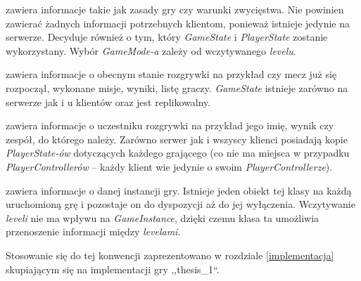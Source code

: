 \documentclass[multip]{SGGW-thesis}
\begin{document}
\begin{description}[itemsep=1\itemsep,parsep=1\parsep,partopsep=1\partopsep,topsep=1\topsep]
\item[GameMode:] zawiera informacje takie jak zasady gry czy warunki zwycięstwa. Nie powinien zawierać żadnych informacji potrzebnych klientom, ponieważ istnieje jedynie na serwerze. Decyduje również o tym, który {\em GameState} i {\em PlayerState} zostanie wykorzystany. Wybór {\em GameMode-a} zależy od wczytywanego {\em levelu}.
\item[GameState:] zawiera informacje o obecnym stanie rozgrywki na przykład czy mecz już się rozpoczął, wykonane misje, wyniki, listę graczy. {\em GameState} istnieje zarówno na serwerze jak i u klientów oraz jest replikowalny.
\item[PlayerState:] zawiera informacje o uczestniku rozgrywki na przykład jego imię, wynik czy zespół, do którego należy. Zarówno serwer jak i wszyscy klienci posiadają kopie {\em PlayerState-ów} dotyczących każdego grającego (co nie ma miejsca w przypadku {\em PlayerControllerów} -- każdy klient wie jedynie o swoim {\em PlayerControllerze}).
\item[GameInstance:] zawiera informacje o danej instancji gry. Istnieje jeden obiekt tej klasy na każdą uruchomioną grę i pozostaje on do dyspozycji aż do jej wyłączenia. Wczytywanie {\em leveli} nie ma wpływu na {\em GameInstance}, dzięki czemu klasa ta umożliwia przenoszenie informacji między {\em levelami}.
\end{description}
Stosowanie się do tej konwencji zaprezentowano w rozdziale \ref{implementacja} skupiającym się na implementacji gry ,,thesis\_1``.
\end{document}
